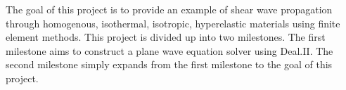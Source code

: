 The goal of this project is to provide an example of shear wave propagation through homogenous, isothermal, isotropic, hyperelastic materials using finite element methods. This project is divided up into two milestones. The first milestone aims to construct a plane wave equation solver using Deal.II. The second milestone simply expands from the first milestone to the goal of this project. 
